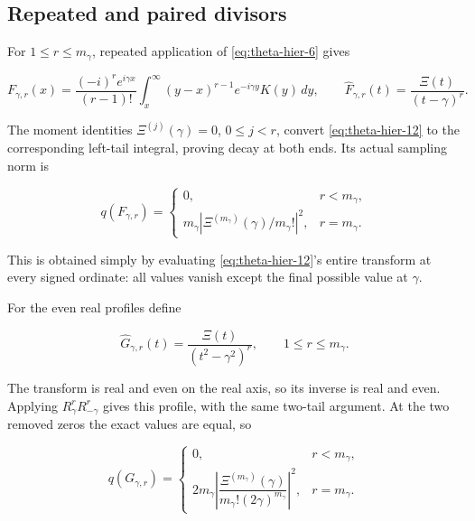 \subsection{Repeated and paired divisors}

For $1\le r\le m_\gamma$, repeated application of \eqref{eq:theta-hier-6} gives

\begin{equation}
F_{\gamma,r}(x)=\frac{(-i)^r e^{i\gamma x}}{(r-1)!}
   \int_x^\infty (y-x)^{r-1}e^{-i\gamma y}K(y)\,dy,
 \qquad
 \widehat F_{\gamma,r}(t)=\frac{\Xi(t)}{(t-\gamma)^r}.
 \label{eq:theta-hier-12}
\end{equation}

The moment identities $\Xi^{(j)}(\gamma)=0$, $0\le j<r$, convert \eqref{eq:theta-hier-12} to the corresponding left-tail integral, proving decay at both ends. Its actual sampling norm is

\begin{equation}
q(F_{\gamma,r})=
 \begin{cases}
 0,&r<m_\gamma,\\
 m_\gamma\left|\Xi^{(m_\gamma)}(\gamma)/m_\gamma!\right|^2,
       &r=m_\gamma.
 \end{cases}
 \label{eq:theta-hier-13}
\end{equation}

This is obtained simply by evaluating \eqref{eq:theta-hier-12}'s entire transform at every signed ordinate: all values vanish except the final possible value at $\gamma$.

For the even real profiles define

\begin{equation}
\widehat G_{\gamma,r}(t)=\frac{\Xi(t)}{(t^2-\gamma^2)^r},
 \qquad 1\le r\le m_\gamma.
 \label{eq:theta-hier-14}
\end{equation}

The transform is real and even on the real axis, so its inverse is real and even. Applying $R_\gamma^rR_{-\gamma}^r$ gives this profile, with the same two-tail argument. At the two removed zeros the exact values are equal, so

\begin{equation}
q(G_{\gamma,r})=
 \begin{cases}
 0,&r<m_\gamma,\\
 2m_\gamma\left|
 \dfrac{\Xi^{(m_\gamma)}(\gamma)}{m_\gamma!(2\gamma)^{m_\gamma}}
                  \right|^2,&r=m_\gamma.
 \end{cases}
 \label{eq:theta-hier-15}
\end{equation}

